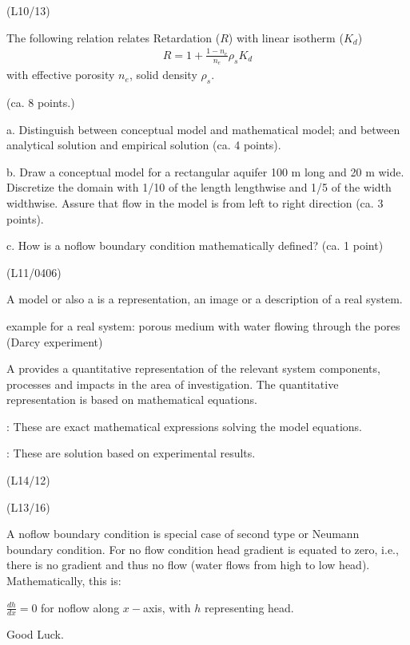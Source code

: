 \documentclass[letterpaper,10pt,english]{sphinxmanual}
\begin{document}
\noindent{}

(L10/13)

The following relation relates Retardation (\(R\)) with linear isotherm (\(K_d\))
\begin{equation*}
\begin{split}
R = 1+ \frac{1-n_e}{n_e}\rho_s K_d
\end{split}
\end{equation*}
with effective porosity \(n_e\), solid density \(\rho_s\).

 (ca. 8 points.)

a. Distinguish between conceptual model and mathematical model; and between analytical solution and empirical solution (ca. 4 points).

b. Draw a conceptual model for a rectangular aquifer 100 m long and 20 m wide. Discretize the domain with 1/10 of the length length\sphinxhyphen{}wise and 1/5 of the width width\sphinxhyphen{}wise. Assure that flow in the model is from left to right direction (ca. 3 points).

c. How is a no\sphinxhyphen{}flow boundary condition mathematically defined? (ca. 1 point)

(L11/04\sphinxhyphen{}06)

A model or also a  is a representation, an image or a description of a real system.

example for a real system: porous medium with water flowing through the pores (Darcy experiment)

A  provides a quantitative representation of the relevant system components, processes and impacts in the area of investigation. The quantitative representation is based on mathematical equations.

 : These are exact mathematical expressions solving the model equations.

 : These are solution based on experimental results.

 \sphinxhyphen{} (L14/12)

\noindent{}

(L13/16)

A no\sphinxhyphen{}flow boundary condition is special case of second type or Neumann boundary condition. For no flow condition head gradient is equated to zero, i.e., there is no gradient and thus no flow (water flows from high to low head). Mathematically, this is:

\(\frac{dh}{dx} = 0 \) for no\sphinxhyphen{}flow along \(x-\)axis, with \(h\) representing head.

Good Luck.







\renewcommand{\indexname}{Index}
\printindex
\end{document}
